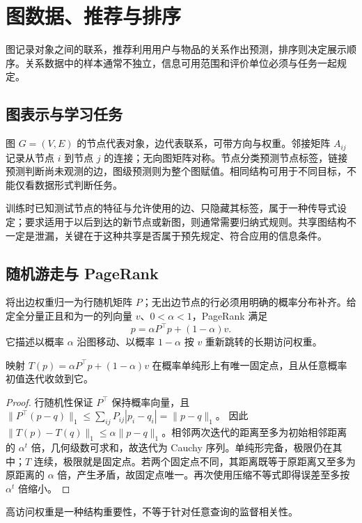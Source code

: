 \setcounter{chapter}{21} %
\chapter{图数据、推荐与排序}
\label{chap:ml-graphs}

图记录对象之间的联系，推荐利用用户与物品的关系作出预测，排序则决定展示顺序。关系数据中的样本通常不独立，信息可用范围和评价单位必须与任务一起规定。

\section{图表示与学习任务}

图 $G=(V,E)$ 的节点代表对象，边代表联系，可带方向与权重。邻接矩阵 $A_{ij}$ 记录从节点 $i$ 到节点 $j$ 的连接；无向图矩阵对称。节点分类预测节点标签，链接预测判断尚未观测的边，图级预测则为整个图赋值。相同结构可用于不同目标，不能仅看数据形式判断任务。

训练时已知测试节点的特征与允许使用的边、只隐藏其标签，属于一种传导式设定；要求适用于以后到达的新节点或新图，则通常需要归纳式规则。共享图结构不一定是泄漏，关键在于这种共享是否属于预先规定、符合应用的信息条件。

\section{随机游走与 PageRank}

将出边权重归一为行随机矩阵 $P$；无出边节点的行必须用明确的概率分布补齐。给定全分量正且和为一的列向量 $v$、$0<\alpha<1$，PageRank 满足
\begin{equation}
 p=\alpha P^\top p+(1-\alpha)v.
 \label{eq:ml-pagerank}
\end{equation}
它描述以概率 $\alpha$ 沿图移动、以概率 $1-\alpha$ 按 $v$ 重新跳转的长期访问权重。

\begin{proposition}
映射 $T(p)=\alpha P^\top p+(1-\alpha)v$ 在概率单纯形上有唯一固定点，且从任意概率初值迭代收敛到它。
\end{proposition}
\begin{proof}
行随机性保证 $P^\top$ 保持概率向量，且
$\|P^\top(p-q)\|_1\leq\sum_{ij}P_{ij}|p_i-q_i|=\|p-q\|_1$。
因此 $\|T(p)-T(q)\|_1\leq\alpha\|p-q\|_1$。相邻两次迭代的距离至多为初始相邻距离的 $\alpha^t$ 倍，几何级数可求和，故迭代为 Cauchy 序列。单纯形完备，极限仍在其中；$T$ 连续，极限就是固定点。若两个固定点不同，其距离既等于原距离又至多为原距离的 $\alpha$ 倍，产生矛盾，故固定点唯一。再次使用压缩不等式即得误差至多按 $\alpha^t$ 倍缩小。
\end{proof}
高访问权重是一种结构重要性，不等于针对任意查询的监督相关性。

